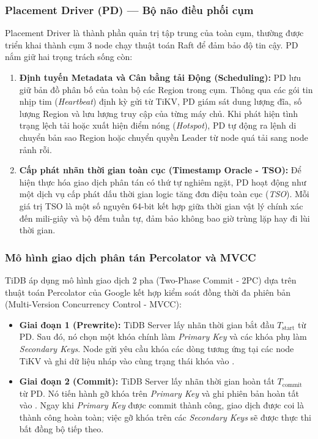 \subsubsection{Placement Driver (PD) --- Bộ não điều phối cụm}
Placement Driver là thành phần quản trị tập trung của toàn cụm, thường được triển khai thành cụm 3 node chạy thuật toán Raft để đảm bảo độ tin cậy. PD nắm giữ hai trọng trách sống còn:
\begin{enumerate}
  \item \textbf{Định tuyến Metadata và Cân bằng tải Động (Scheduling):} PD lưu giữ bản đồ phân bố của toàn bộ các Region trong cụm. Thông qua các gói tin nhịp tim (\textit{Heartbeat}) định kỳ gửi từ TiKV, PD giám sát dung lượng đĩa, số lượng Region và lưu lượng truy cập của từng máy chủ. Khi phát hiện tình trạng lệch tải hoặc xuất hiện điểm nóng (\textit{Hotspot}), PD tự động ra lệnh di chuyển bản sao Region hoặc chuyển quyền Leader từ node quá tải sang node rảnh rỗi.
  \item \textbf{Cấp phát nhãn thời gian toàn cục (Timestamp Oracle - TSO):} Để hiện thực hóa giao dịch phân tán có thứ tự nghiêm ngặt, PD hoạt động như một dịch vụ cấp phát dấu thời gian logic tăng đơn điệu toàn cục (\textit{TSO}). Mỗi giá trị TSO là một số nguyên 64-bit kết hợp giữa thời gian vật lý chính xác đến mili-giây và bộ đếm tuần tự, đảm bảo không bao giờ trùng lặp hay đi lùi thời gian.
\end{enumerate}

\subsubsection{Mô hình giao dịch phân tán Percolator và MVCC}
TiDB áp dụng mô hình giao dịch 2 pha (Two-Phase Commit - 2PC) dựa trên thuật toán Percolator của Google kết hợp kiểm soát đồng thời đa phiên bản (Multi-Version Concurrency Control - MVCC):
\begin{itemize}
  \item \textbf{Giai đoạn 1 (Prewrite):} TiDB Server lấy nhãn thời gian bắt đầu $T_{\text{start}}$ từ PD. Sau đó, nó chọn một khóa chính làm \textit{Primary Key} và các khóa phụ làm \textit{Secondary Keys}. Node gửi yêu cầu khóa các dòng tương ứng tại các node TiKV và ghi dữ liệu nháp vào  cùng trạng thái khóa vào .
  \item \textbf{Giai đoạn 2 (Commit):} TiDB Server lấy nhãn thời gian hoàn tất $T_{\text{commit}}$ từ PD. Nó tiến hành gỡ khóa trên \textit{Primary Key} và ghi phiên bản hoàn tất vào . Ngay khi \textit{Primary Key} được commit thành công, giao dịch được coi là thành công hoàn toàn; việc gỡ khóa trên các \textit{Secondary Keys} sẽ được thực thi bất đồng bộ tiếp theo.
\end{itemize}

